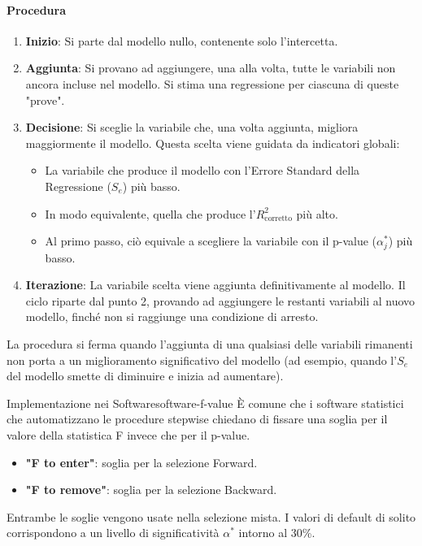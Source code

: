 \paragraph{Procedura}
\begin{enumerate}
    \item \textbf{Inizio}: Si parte dal modello nullo, contenente solo
    l'intercetta.
    \item \textbf{Aggiunta}: Si provano ad aggiungere, una alla volta, tutte le
    variabili non ancora incluse nel modello. Si stima una regressione per
    ciascuna di queste "prove".
    \item \textbf{Decisione}: Si sceglie la variabile che, una volta aggiunta,
    migliora maggiormente il modello. Questa scelta viene guidata da indicatori
    globali:
    \begin{itemize}
        \item La variabile che produce il modello con l'Errore Standard della
        Regressione (\(S_e\)) più basso.
        \item In modo equivalente, quella che produce
        l'\(R^2_{\text{corretto}}\) più alto.
        \item Al primo passo, ciò equivale a scegliere la variabile con il
        p-value (\(\alpha_j^*\)) più basso.
    \end{itemize}
    \item \textbf{Iterazione}: La variabile scelta viene aggiunta
    definitivamente al modello. Il ciclo riparte dal punto 2, provando ad
    aggiungere le restanti variabili al nuovo modello, finché non si raggiunge
    una condizione di arresto.
\end{enumerate}

La procedura si ferma quando l'aggiunta di una qualsiasi delle variabili
rimanenti non porta a un miglioramento significativo del modello (ad esempio,
quando l'\(S_e\) del modello smette di diminuire e inizia ad aumentare).

\begin{nota}{Implementazione nei Software}{software-f-value}
È comune che i software statistici che automatizzano le procedure stepwise
chiedano di fissare una soglia per il valore della statistica F invece che per
il p-value.
\begin{itemize}
    \item \textbf{"F to enter"}: soglia per la selezione Forward.
    \item \textbf{"F to remove"}: soglia per la selezione Backward.
\end{itemize}
Entrambe le soglie vengono usate nella selezione mista. I valori di default di
solito corrispondono a un livello di significatività \(\alpha^*\) intorno al
30\%.
\end{nota}

